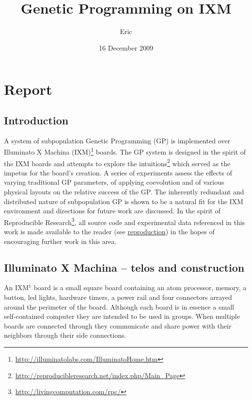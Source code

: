 \documentclass[11pt]{article}
\title{Genetic Programming on IXM}
\author{Eric}
\date{16 December 2009}
\begin{document}
\maketitle


\section*{Report}
\label{sec-1}

\subsection*{Introduction}
\label{sec-1.1}

A system of subpopulation Genetic Programming (GP) is implemented over
Illuminato X Machina (IXM)\footnote{\href{http://illuminatolabs.com/IlluminatoHome.htm}{http://illuminatolabs.com/IlluminatoHome.htm} } boards.  The GP system is designed in
the spirit of the IXM boards and attempts to explore the
intuitions\footnote{\href{http://reproducibleresearch.net/index.php/Main_Page}{http://reproducibleresearch.net/index.php/Main\_Page} } which served as the impetus for the board's creation.
A series of experiments assess the effects of varying traditional GP
parameters, of applying coevolution and of various physical layouts on
the relative success of the GP.  The inherently redundant and
distributed nature of subpopulation GP is shown to be a natural fit
for the IXM environment and directions for future work are discussed.
In the spirit of Reproducible Research\footnote{\href{http://livingcomputation.com/rpc/}{http://livingcomputation.com/rpc/} }, all source code and
experimental data referenced in this work is made available to the
reader (see \hyperref[sec-1.8]{reproduction}) in the hopes of encouraging further work in
this area.

\subsection*{Illuminato X Machina -- telos and construction}
\label{sec-1.2}

An IXM$^{1}$ board is a small square board containing an atom
processor, memory, a button, led lights, hardware timers, a power rail
and four connectors arrayed around the perimeter of the board.
Although each board is in essence a small self-contained computer they
are intended to be used in groups.  When multiple boards are connected
through they communicate and share power with their neighbors through
their side connections.
\end{document}

